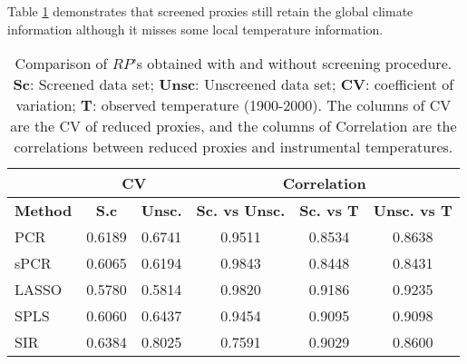 \documentclass[11pt]{article}
\begin{document}
\begin{itemize}
Table \ref{tab:screening2} demonstrates that screened proxies still retain the global climate information although it misses some local temperature information.
\begin{table}[htp]
  \centering
  \begin{tabular}{l|cc|c|cc}
  \toprule
 &  \multicolumn{2}{c|}{CV} & \multicolumn{3}{c}{Correlation}\\
 \hline
\textbf{Method} & \textbf{S.c} & \textbf{Unsc.} & \textbf{Sc. vs Unsc.} & \textbf{Sc. vs T} & \textbf{Unsc. vs T}\\ 
  \midrule
PCR & 0.6189 & 0.6741 & 0.9511 & 0.8534 & 0.8638 \\ 
  sPCR & 0.6065 & 0.6194 & 0.9843 & 0.8448 & 0.8431 \\ 
  LASSO & 0.5780 & 0.5814 & 0.9820 & 0.9186 & 0.9235 \\ 
  SPLS & 0.6060 & 0.6437 & 0.9454 & 0.9095 & 0.9098 \\ 
  SIR & 0.6384 & 0.8025 & 0.7591 & 0.9029 & 0.8600 \\ 
   \bottomrule
\end{tabular}
  \caption{Comparison of $RP$'s obtained with and without screening procedure. \textbf{Sc}: Screened data set; \textbf{Unsc}: Unscreened data set; \textbf{CV}: coefficient of variation; \textbf{T}: observed temperature (1900-2000). The columns of CV are the CV of reduced proxies, and the columns of Correlation are the correlations between reduced proxies and instrumental temperatures.}
  \label{tab:screening2}
\end{table}


\end{itemize}
\end{document}
